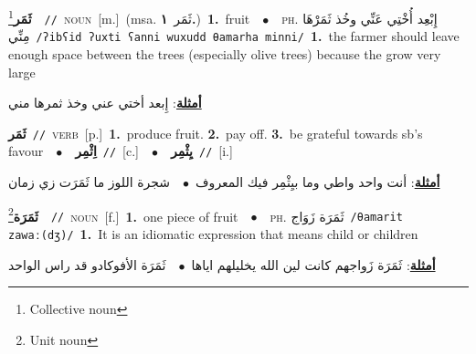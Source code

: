 \documentclass[10pt,a4paper,twoside]{article} %
\begin{document}
\begin{multicols}{2}
{\setlength\topsep{0pt}\textbf{\foreignlanguage{arabic}{ثَمَر}}\footnote{Collective noun}\ \ {\color{gray}\texttt{//}\color{black}}\ \textsc{noun}\ [m.]\ \color{gray}(msa. \foreignlanguage{arabic}{ثَمَر}~\foreignlanguage{arabic}{\textbf{١.}})\color{black}\ \textbf{1.}~fruit\ \ $\bullet$\ \ \textsc{ph.} \color{gray} \foreignlanguage{arabic}{إِبْعِد أُخْتِي عَنِّي وخُذ ثَمَرْهَا مِنِّي}\color{black}\ {\color{gray}\texttt{/{\sffamily ʔibʕid ʔuxti ʕanni wuxudd θamarha minni}/}\color{black}}\ \textbf{1.}~the farmer should leave enough space between the trees (especially olive trees) because the grow very large\  \begin{flushright}\color{gray}\foreignlanguage{arabic}{\textbf{\underline{\foreignlanguage{arabic}{أمثلة}}}: إِبعد أختي عني وخذ ثمرها مني}\end{flushright}\color{black}} \vspace{2mm}

{\setlength\topsep{0pt}\textbf{\foreignlanguage{arabic}{ثَمَر}}\ {\color{gray}\texttt{//}\color{black}}\ \textsc{verb}\ [p.]\ \textbf{1.}~produce fruit.  \textbf{2.}~pay off.  \textbf{3.}~be grateful towards sb's favour\ \ $\bullet$\ \ \setlength\topsep{0pt}\textbf{\foreignlanguage{arabic}{اِثْمِر}}\ {\color{gray}\texttt{//}\color{black}}\ [c.]\ \ $\bullet$\ \ \setlength\topsep{0pt}\textbf{\foreignlanguage{arabic}{يِثْمِر}}\ {\color{gray}\texttt{//}\color{black}}\ [i.]\  \begin{flushright}\color{gray}\foreignlanguage{arabic}{\textbf{\underline{\foreignlanguage{arabic}{أمثلة}}}: أنت واحد واطي وما بيِثْمِر فيك المعروف\ $\bullet$\ \  شجرة اللوز ما ثَمَرَت زي زمان}\end{flushright}\color{black}} \vspace{2mm}

{\setlength\topsep{0pt}\textbf{\foreignlanguage{arabic}{ثَمَرَة}}\footnote{Unit noun}\ \ {\color{gray}\texttt{//}\color{black}}\ \textsc{noun}\ [f.]\ \textbf{1.}~one piece of fruit\ \ $\bullet$\ \ \textsc{ph.} \color{gray} \foreignlanguage{arabic}{ثَمَرَة زَوَاج}\color{black}\ {\color{gray}\texttt{/{\sffamily θamarit zawaː(dʒ)}/}\color{black}}\ \textbf{1.}~It is an idiomatic expression that means child or children\  \begin{flushright}\color{gray}\foreignlanguage{arabic}{\textbf{\underline{\foreignlanguage{arabic}{أمثلة}}}: ثَمَرَة زَواجهم كانت لين الله يخليلهم اياها\ $\bullet$\ \  ثَمَرَة الأفوكادو قد راس الواحد}\end{flushright}\color{black}} \vspace{2mm}


\end{multicols}
\end{document}
